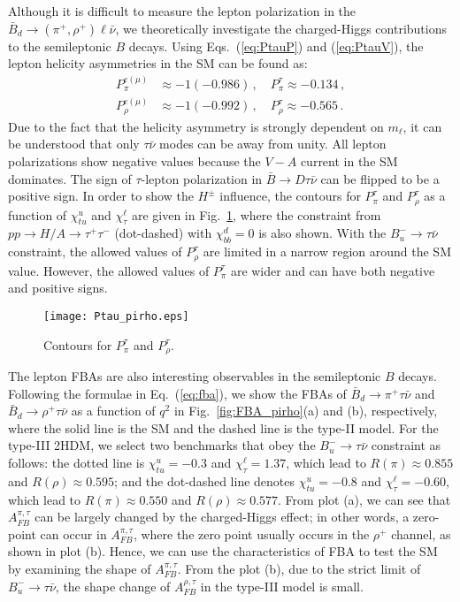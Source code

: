 \documentclass[prd,preprint,superscriptaddress,amsmath,amssymb]{revtex4}
\begin{document}
   Although it is difficult to measure the lepton polarization in the $\bar B_d \to (\pi^+, \rho^+) \ell \bar\nu$, we theoretically investigate the charged-Higgs contributions to the semileptonic $B$ decays.  Using Eqs.~(\ref{eq:PtauP}) and (\ref{eq:PtauV}), the lepton helicity asymmetries  in the SM can be found as:
     \begin{align}
  P^{e(\mu)}_\pi & \approx -1 (-0.986) \,, \quad P^{\tau}_\pi  \approx  -0.134\,, \nonumber \\
  P^{e(\mu)}_{\rho} & \approx -1 ( -0.992)\,, \quad P^{\tau}_{\rho} \approx -0.565\,.
  \end{align}
Due to the fact that the helicity asymmetry is strongly dependent on $m_\ell$,  it can be understood that only $\tau\bar\nu$ modes can be away from unity. All lepton polarizations show negative values because the $V-A$ current in the SM dominates. The sign of $\tau$-lepton polarization in $\bar B \to D \tau\bar\nu$ can be flipped to be a  positive sign. In order to show the $H^\pm$ influence, the contours for $P^{\tau}_{\pi}$ and $P^{\tau}_{\rho}$ as a function of $\chi^u_{tu}$ and $\chi^\ell_\tau$ are given in Fig.~\ref{fig:Ptau_pirho},  where the constraint from $pp\to H/A\to \tau^+ \tau^-$ (dot-dashed) with $\chi^d_{bb}=0$ is also shown. With the $B^-_u \to \tau \bar\nu$ constraint, the allowed values of $P^{\tau}_{\rho}$ are limited in a  narrow region around the SM value. However, the allowed values of $P^\tau_\pi$ are wider and can have both negative and positive signs. 
  
  

 \begin{figure}[phtb]

\texttt{[image: Ptau\_pirho.eps]}
\caption{ Contours for $P^\tau_\pi$ and $P^\tau_{\rho}$.   }
\label{fig:Ptau_pirho}
\end{figure} 

The lepton FBAs are also interesting observables in the semileptonic $B$ decays. Following the formulae in Eq.~(\ref{eq:fba}), we show the FBAs of  $\bar B_d \to \pi^+ \tau \bar\nu$ and $\bar B_d \to \rho^+ \tau \bar\nu$ as a function of $q^2$ in Fig.~\ref{fig:FBA_pirho}(a) and (b), respectively, where the solid line is the SM and  the dashed line is the type-II model. For the type-III 2HDM, we select two benchmarks that obey the $B^-_u \to \tau \bar\nu$ constraint as follows: the dotted line is  $\chi^u_{tu}=-0.3$ and $\chi^\ell_\tau=1.37$, which lead to $R(\pi)\approx 0.855$ and $R(\rho)\approx 0.595$; and the dot-dashed line denotes $\chi^u_{tu}=-0.8$ and $\chi^\ell_\tau=-0.60$, which lead to $R(\pi)\approx 0.550$ and $R(\rho)\approx 0.577$. From plot (a), we can see that $A^{\pi,\tau}_{FB}$ can be largely  changed  by the charged-Higgs effect; in other words, a zero-point  can occur in $A^{\pi,\tau}_{FB}$, where the zero point usually occurs in the $\rho^+$ channel, as shown in plot (b). Hence, we can use the characteristics of FBA to test the SM by examining the shape of $A^{\pi,\tau}_{FB}$.  From the plot (b), due to the strict limit of $B^-_u \to \tau \bar\nu$, the shape change of $A^{\rho,\tau}_{FB}$ in the type-III model is small. 
\end{document}
